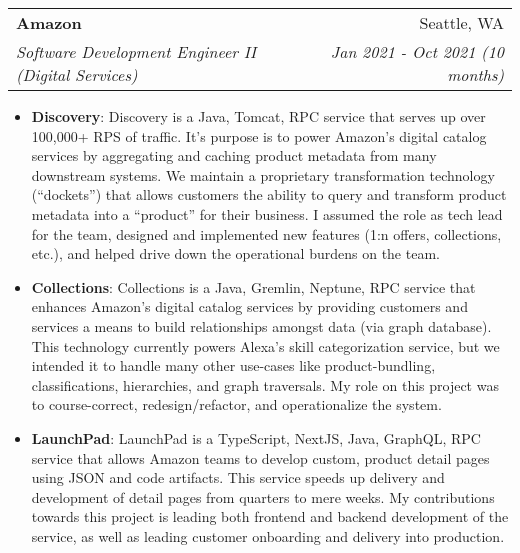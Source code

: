 \documentclass[letterpaper,11pt]{article}
\makeatletter
\newcommand{\resumeItem}[2]{
  \item\small{
    \textbf{#1}{: #2 \vspace{-2pt}}
  }
}
\newcommand{\resumeSubheading}[4]{
  \vspace{-1pt}\item
    \begin{tabular*}{0.97\textwidth}[t]{l@{\extracolsep{\fill}}r}
      \textbf{#1} & #2 \\
      \textit{\small#3} & \textit{\small #4} \\
    \end{tabular*}\vspace{-5pt}
}
\newcommand{\resumeItemListStart}{\begin{itemize}}
\newcommand{\resumeItemListEnd}{\end{itemize}\vspace{-5pt}}
\makeatother
\begin{document}
    \resumeSubheading
      {Amazon}{Seattle, WA}
      {Software Development Engineer II (Digital Services)}{Jan 2021 - Oct 2021 (10 months)}
      \resumeItemListStart
        \resumeItem{Discovery}
          {Discovery is a Java, Tomcat, RPC service that serves up over 100,000+ RPS of traffic. It's purpose is to power Amazon's digital catalog services by aggregating and caching product metadata from many downstream systems. We maintain a proprietary transformation technology (``dockets'') that allows customers the ability to query and transform product metadata into a ``product'' for their business. I assumed the role as tech lead for the team, designed and implemented new features (1:n offers, collections, etc.), and helped drive down the operational burdens on the team.}
        \resumeItem{Collections}
          {Collections is a Java, Gremlin, Neptune, RPC service that enhances Amazon's digital catalog services by providing customers and services a means to build relationships amongst data (via graph database). This technology currently powers Alexa's skill categorization service, but we intended it to handle many other use-cases like product-bundling, classifications, hierarchies, and graph traversals. My role on this project was to course-correct, redesign/refactor, and operationalize the system.}
        \resumeItem{LaunchPad}
          {LaunchPad is a TypeScript, NextJS, Java, GraphQL, RPC service that allows Amazon teams to develop custom, product detail pages using JSON and code artifacts. This service speeds up delivery and development of detail pages from quarters to mere weeks. My contributions towards this project is leading both frontend and backend development of the service, as well as leading customer onboarding and delivery into production.}
      \resumeItemListEnd
\end{document}
